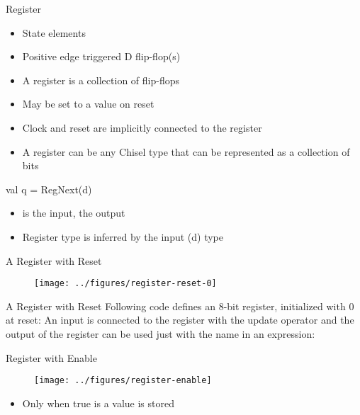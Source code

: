 \begin{frame}[fragile]{Register}
\begin{itemize}
\item State elements
\item Positive edge triggered D flip-flop(s)
\item A register is a collection of flip-flops
\item May be set to a value on reset
\item Clock and reset are implicitly connected to the register
\item A register can be any Chisel type that can be represented as a collection of bits
\end{itemize}
\begin{chisel}
val q = RegNext(d)
\end{chisel}
\begin{itemize}
\item {} is the input,  the output
\item Register type is inferred by the input (d) type
\end{itemize}
\end{frame}



\begin{frame}[fragile]{A Register with Reset}
\begin{figure}
  \texttt{[image: ../figures/register-reset-0]}
\end{figure}
\end{frame}


\begin{frame}[fragile]{A Register with Reset}
Following code defines an 8-bit register, initialized with 0 at reset:
\noindent An input is connected to the register with the \code{:=} update operator and
the output of the register can be used just with the name in an expression:
\end{frame}

\begin{frame}[fragile]{Register with Enable}
\begin{figure}
  \texttt{[image: ../figures/register-enable]}
\end{figure}
\begin{itemize}
\item Only when  true is a value is stored
\end{itemize}
\end{frame}

